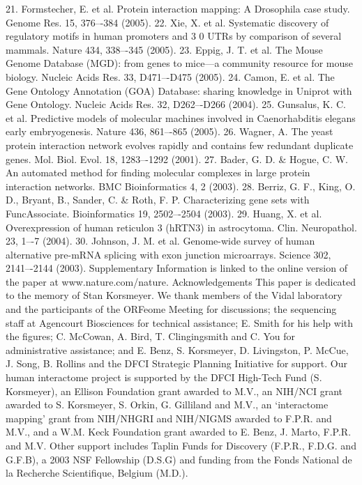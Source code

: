21.
Formstecher, E. et al. Protein interaction mapping: A Drosophila case study.
Genome Res. 15, 376–-384 (2005).
22. Xie, X. et al. Systematic discovery of regulatory motifs in human promoters
and 3
0 UTRs by comparison of several mammals. Nature 434, 338–-345
(2005).
23. Eppig, J. T. et al. The Mouse Genome Database (MGD): from genes to mice—a
community resource for mouse biology. Nucleic Acids Res. 33, D471–-D475
(2005).
24. Camon, E. et al. The Gene Ontology Annotation (GOA) Database: sharing
knowledge in Uniprot with Gene Ontology. Nucleic Acids Res. 32, D262–-D266
(2004).
25. Gunsalus, K. C. et al. Predictive models of molecular machines involved in
Caenorhabditis elegans early embryogenesis. Nature 436, 861–-865 (2005).
26. Wagner, A. The yeast protein interaction network evolves rapidly and contains
few redundant duplicate genes. Mol. Biol. Evol. 18, 1283–-1292 (2001).
27. Bader, G. D. \& Hogue, C. W. An automated method for ﬁnding molecular
complexes in large protein interaction networks. BMC Bioinformatics 4, 2
(2003).
28. Berriz, G. F., King, O. D., Bryant, B., Sander, C. \& Roth, F. P. Characterizing gene
sets with FuncAssociate. Bioinformatics 19, 2502–-2504 (2003).
29. Huang, X. et al. Overexpression of human reticulon 3 (hRTN3) in astrocytoma.
Clin. Neuropathol. 23, 1–-7 (2004).
30. Johnson, J. M. et al. Genome-wide survey of human alternative pre-mRNA
splicing with exon junction microarrays. Science 302, 2141–-2144 (2003).
Supplementary Information is linked to the online version of the paper at
www.nature.com/nature.
Acknowledgements This paper is dedicated to the memory of Stan Korsmeyer.
We thank members of the Vidal laboratory and the participants of the ORFeome
Meeting for discussions; the sequencing staff at Agencourt Biosciences for
technical assistance; E. Smith for his help with the ﬁgures; C. McCowan, A. Bird,
T. Clingingsmith and C. You for administrative assistance; and E. Benz,
S. Korsmeyer, D. Livingston, P. McCue, J. Song, B. Rollins and the DFCI Strategic
Planning Initiative for support. Our human interactome project is supported by
the DFCI High-Tech Fund (S. Korsmeyer), an Ellison Foundation grant awarded
to M.V., an NIH/NCI grant awarded to S. Korsmeyer, S. Orkin, G. Gilliland and
M.V., an ‘interactome mapping’ grant from NIH/NHGRI and NIH/NIGMS
awarded to F.P.R. and M.V., and a W.M. Keck Foundation grant awarded to
E. Benz, J. Marto, F.P.R. and M.V. Other support includes Taplin Funds for
Discovery (F.P.R., F.D.G. and G.F.B), a 2003 NSF Fellowship (D.S.G) and funding
from the Fonds National de la Recherche Scientiﬁque, Belgium (M.D.).
